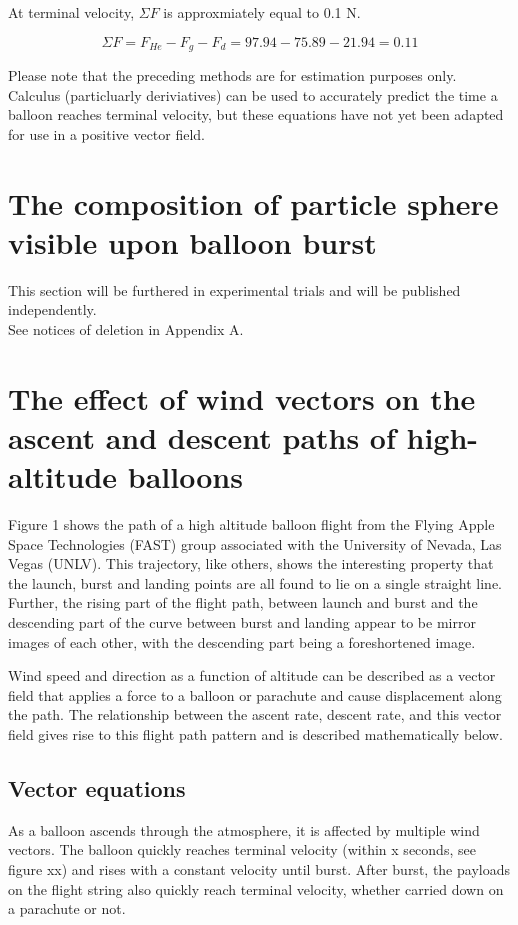 \documentclass[useAMS,usenatbib]{mn2e}
\begin{document}
At terminal velocity, $\Sigma F$ is approxmiately equal to 0.1 N.

\begin{equation}
\Sigma F = F_{He} - F_g - F_d = 97.94 - 75.89 - 21.94 = 0.11
\end{equation}


Please note that the preceding methods are for estimation purposes only. Calculus (particluarly deriviatives) can be used to accurately predict the time a balloon reaches terminal velocity, but these equations have not yet been adapted for use in a positive vector field.

\section[]{The composition of particle sphere visible upon balloon burst}

This section will be furthered in experimental trials and will be published independently.\\

See notices of deletion in Appendix A.

\section[]{The effect of wind vectors on the ascent and descent paths of
high-altitude balloons}
Figure 1 shows the path of a high altitude balloon flight from the Flying Apple Space Technologies (FAST) group associated with the University of Nevada, Las Vegas (UNLV). This trajectory, like others, shows the interesting property that the launch, burst and landing points are all found to lie on a single straight line. Further, the rising part of the flight path, between launch and burst and the descending part of the curve between burst and landing appear to be mirror images of each other, with the descending part being a foreshortened image.

Wind speed and direction as a function of altitude can be described as a vector field that applies a force to a balloon or parachute and cause displacement along the path. The relationship between the ascent rate, descent rate, and this vector field gives rise to this flight path pattern and is described mathematically below.

\subsection[]{Vector equations}
As a balloon ascends through the atmosphere, it is affected by multiple wind vectors. The balloon quickly reaches terminal velocity (within x seconds, see figure xx) and rises with a constant velocity until burst. After burst, the payloads on the flight string also quickly reach terminal velocity, whether carried down on a parachute or not.
\end{document}
